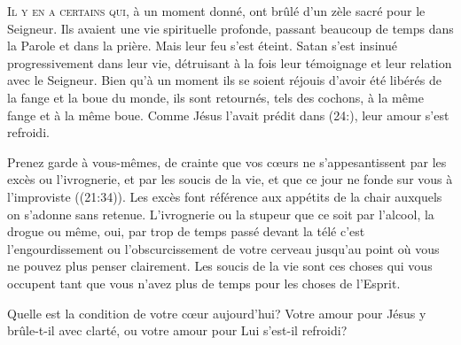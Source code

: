 \dvrule







\lettrine{I}{l y en a certains qui,} à un moment donné,
 ont brûlé d'un zèle sacré pour le Seigneur.
 Ils avaient une vie spirituelle profonde, passant beaucoup de temps
 dans la Parole et dans la prière. Mais leur feu s'est éteint.
 Satan s'est insinué progressivement dans leur vie, détruisant à la fois
 leur témoignage et leur relation avec le Seigneur.
 Bien qu'à un moment ils se soient réjouis d'avoir été libérés
 de la fange et la boue du monde, ils sont retournés, tels des cochons,
 à la même fange et à la même boue.
 Comme Jésus l'avait prédit dans (24:),
 leur amour s'est refroidi. 


\og Prenez garde à vous-mêmes, de crainte que vos cœurs
 ne s'appesantissent par les excès ou l'ivrognerie,
 et par les soucis de la vie, et que ce jour ne fonde sur vous
 à l'improviste \fg{} ((21:34)).
 Les excès font référence aux appétits de la chair auxquels
 on s'adonne sans retenue. L'ivrognerie ou la stupeur
 \ocadr que ce soit par l'alcool, la drogue ou même, oui,
 par trop de temps passé devant la télé \fcadr{} c'est l'engourdissement
 ou l'obscurcissement de votre cerveau jusqu'au point
 où vous ne pouvez plus penser clairement.
 Les soucis de la vie sont ces choses qui vous occupent
 tant que vous n'avez plus de temps pour les choses de l'Esprit. 

Quelle est la condition de votre cœur aujourd'hui?
 Votre amour pour Jésus y brûle-t-il avec clarté,
 ou votre amour pour Lui s'est-il refroidi? 

\dvrule




